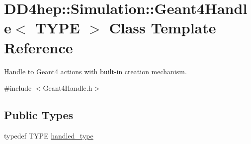 \hypertarget{class_d_d4hep_1_1_simulation_1_1_geant4_handle}{
\section{DD4hep::Simulation::Geant4Handle$<$ TYPE $>$ Class Template Reference}
\label{class_d_d4hep_1_1_simulation_1_1_geant4_handle}
}


\hyperlink{class_d_d4hep_1_1_handle}{Handle} to Geant4 actions with built-\/in creation mechanism.  


{\ttfamily \#include $<$Geant4Handle.h$>$}\subsection*{Public Types}
\begin{DoxyCompactItemize}
\item 
typedef TYPE \hyperlink{class_d_d4hep_1_1_simulation_1_1_geant4_handle_a35e583b9228e38c95d23112ad19b645d}{handled\_\-type}
\end{DoxyCompactItemize}
